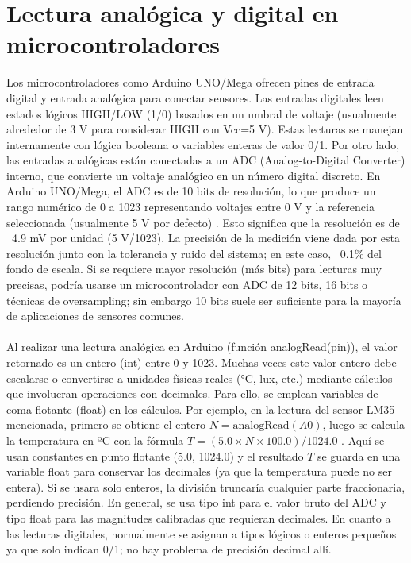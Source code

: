 \section{Lectura analógica y digital en microcontroladores}
Los microcontroladores como Arduino UNO/Mega ofrecen pines de entrada digital y entrada analógica para conectar sensores. Las entradas digitales leen estados lógicos HIGH/LOW (1/0) basados en un umbral de voltaje (usualmente alrededor de 3 V para considerar HIGH con Vcc=5 V). Estas lecturas se manejan internamente con lógica booleana o variables enteras de valor 0/1. Por otro lado, las entradas analógicas están conectadas a un ADC (Analog-to-Digital Converter) interno, que convierte un voltaje analógico en un número digital discreto. En Arduino UNO/Mega, el ADC es de 10 bits de resolución, lo que produce un rango numérico de 0 a 1023 representando voltajes entre 0 V y la referencia seleccionada (usualmente 5 V por defecto)
\cite{Sensores-1}. Esto significa que la resolución es de ~4.9 mV por unidad (5 V/1023). La precisión de la medición viene dada por esta resolución junto con la tolerancia y ruido del sistema; en este caso, ~0.1\% del fondo de escala. Si se requiere mayor resolución (más bits) para lecturas muy precisas, podría usarse un microcontrolador con ADC de 12 bits, 16 bits o técnicas de oversampling; sin embargo 10 bits suele ser suficiente para la mayoría de aplicaciones de sensores comunes. 
\\\\
Al realizar una lectura analógica en Arduino (función analogRead(pin)), el valor retornado es un entero (int) entre 0 y 1023. Muchas veces este valor entero debe escalarse o convertirse a unidades físicas reales (°C, lux, etc.) mediante cálculos que involucran operaciones con decimales. Para ello, se emplean variables de coma flotante (float) en los cálculos. Por ejemplo, en la lectura del sensor LM35 mencionada, primero se obtiene el entero $N = \text{analogRead}(A0)$, luego se calcula la temperatura en ºC con la fórmula $T = (5.0 \times N \times 100.0)/1024.0$ \cite{Actuadores-2}. Aquí se usan constantes en punto flotante (5.0, 1024.0) y el resultado $T$ se guarda en una variable float para conservar los decimales (ya que la temperatura puede no ser entera). Si se usara solo enteros, la división truncaría cualquier parte fraccionaria, perdiendo precisión. En general, se usa tipo int para el valor bruto del ADC y tipo float para las magnitudes calibradas que requieran decimales. En cuanto a las lecturas digitales, normalmente se asignan a tipos lógicos o enteros pequeños ya que solo indican 0/1; no hay problema de precisión decimal allí. 
